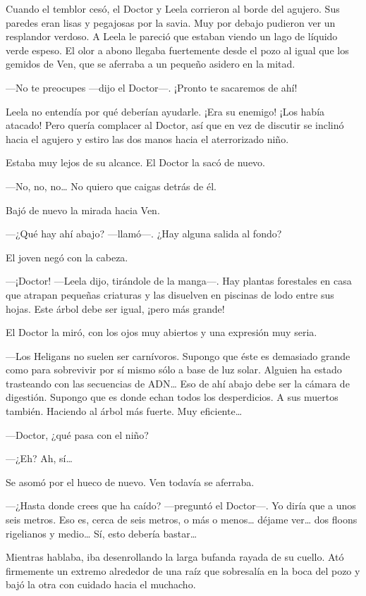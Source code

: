 Cuando el temblor cesó, el Doctor y Leela corrieron al borde del
agujero. Sus paredes eran lisas y pegajosas por la savia. Muy por debajo
pudieron ver un resplandor verdoso. A Leela le pareció que estaban
viendo un lago de líquido verde espeso. El olor a abono llegaba
fuertemente desde el pozo al igual que los gemidos de Ven, que se
aferraba a un pequeño asidero en la mitad.

---No te preocupes ---dijo el Doctor---. ¡Pronto te sacaremos de ahí!

Leela no entendía por qué deberían ayudarle. ¡Era su enemigo! ¡Los había
atacado! Pero quería complacer al Doctor, así que en vez de discutir se
inclinó hacia el agujero y estiro las dos manos hacia el aterrorizado
niño.

Estaba muy lejos de su alcance. El Doctor la sacó de nuevo.

---No, no, no\ldots{} No quiero que caigas detrás de él.

Bajó de nuevo la mirada hacia Ven.

---¿Qué hay ahí abajo? ---llamó---. ¿Hay alguna salida al fondo?

El joven negó con la cabeza.

---¡Doctor! ---Leela dijo, tirándole de la manga---. Hay plantas
forestales en casa que atrapan pequeñas criaturas y las disuelven en
piscinas de lodo entre sus hojas. Este árbol debe ser igual, ¡pero más
grande!

El Doctor la miró, con los ojos muy abiertos y una expresión muy seria.

---Los Heligans no suelen ser carnívoros. Supongo que éste es demasiado
grande como para sobrevivir por sí mismo sólo a base de luz solar.
Alguien ha estado trasteando con las secuencias de ADN\ldots{} Eso de
ahí abajo debe ser la cámara de digestión. Supongo que es donde echan
todos los desperdicios. A sus muertos también. Haciendo al árbol más
fuerte. Muy eficiente\ldots{}

---Doctor, ¿qué pasa con el niño?

---¿Eh? Ah, sí\ldots{}

Se asomó por el hueco de nuevo. Ven todavía se aferraba.

---¿Hasta donde crees que ha caído? ---preguntó el Doctor---. Yo diría
que a unos seis metros. Eso es, cerca de seis metros, o más o
menos\ldots{} déjame ver\ldots{} dos floons rigelianos y medio\ldots{}
Sí, esto debería bastar\ldots{}

Mientras hablaba, iba desenrollando la larga bufanda rayada de su
cuello. Ató firmemente un extremo alrededor de una raíz que sobresalía
en la boca del pozo y bajó la otra con cuidado hacia el muchacho.

